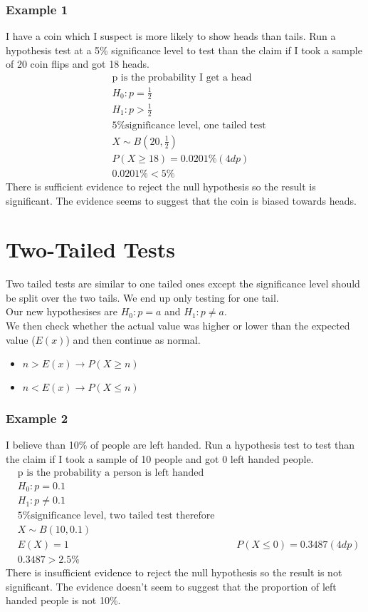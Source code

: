 \documentclass[class=article, crop=false]{standalone}
\begin{document}
\subsubsection*{Example 1}
I have a coin which I suspect is more likely to show heads than tails. Run a hypothesis test at a 5\% significance level to test than the claim if I took a sample of 20 coin flips and got 18 heads. 
\begin{align*}
& \text{p is the probability I get a head} \\
& H_0: p = \frac{1}{2} \\
& H_1: p > \frac{1}{2} \\
& \text{5\% significance level, one tailed test} \\
& X \sim B(20,\frac{1}{2}) \\
& P(X \geqslant 18) = 0.0201\% (4dp) \\
& 0.0201\%  < 5\%
\end{align*}
There is sufficient evidence to reject the null hypothesis so the result is significant. The evidence seems to suggest that the coin is biased towards heads. 

\section*{Two-Tailed Tests}
Two tailed tests are similar to one tailed ones except the significance level should be split over the two tails. We end up only testing for one tail. \\
Our new hypothesises are $H_0: p = a$ and $H_1: p \neq a$. \\
We then check whether the actual value was higher or lower than the expected value ($E(x)$) and then continue as normal. 
\begin{itemize}
	\item $n > E(x) \rightarrow P(X \geqslant n)$
	\item $n < E(x) \rightarrow P(X \leqslant n)$
\end{itemize}
\subsubsection*{Example 2}
I believe than 10\% of people are left handed. Run a hypothesis test to test than the claim if I took a sample of 10 people and got 0 left handed people.
\begin{align*}
& \text{p is the probability a person is left handed} \\
& H_0: p = 0.1 \\
& H_1: p \neq 0.1 \\
& \text{5\% significance level, two tailed test therefore 2.5\% each tail} \\
& X \sim B(10,0.1) \\
& E(X) = 1
& P(X \leqslant 0) = 0.3487 (4dp) \\
& 0.3487 > 2.5\%
\end{align*}
There is insufficient evidence to reject the null hypothesis so the result is not significant. The evidence doesn't seem to suggest that the proportion of left handed people is not 10\%.\\
\end{document}
